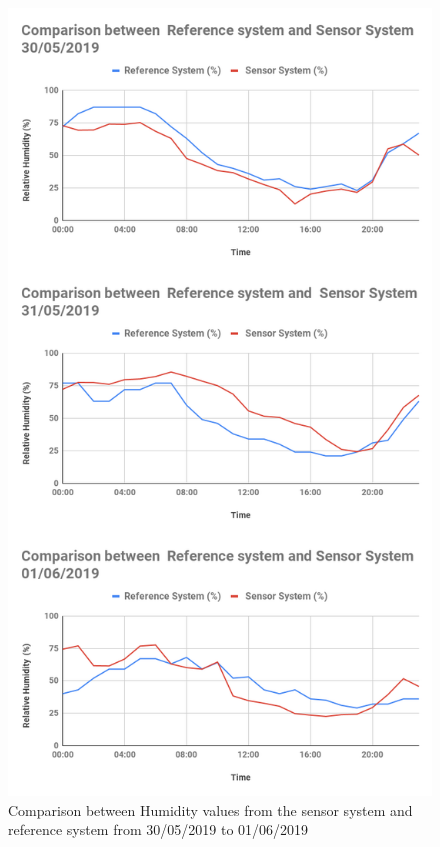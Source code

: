 \begin{figure}[h]
  \begin{center}
  \includegraphics[scale=0.45]{images/figure87hum.png}
  \end{center}
  \caption{Comparison between Humidity values from the sensor system and reference system from 30/05/2019 to 01/06/2019}
\label{hum}

\end{figure}


